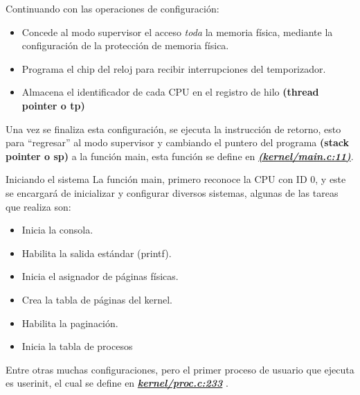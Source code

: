 \documentclass{libs/ufc_format}
\begin{document}
\begin{frame}{}
  Continuando con las operaciones de configuración:
  \begin{itemize}
    \item Concede al modo supervisor el acceso \emph{toda} la memoria física, mediante la configuración de la protección de memoria física.
    \item Programa el chip del reloj para recibir interrupciones del temporizador.
    \item Almacena el identificador de cada CPU en el registro de hilo \textbf{(thread pointer o tp)}
  \end{itemize}

  \vspace{0.3cm}

  Una vez se finaliza esta configuración, se ejecuta la instrucción de retorno, esto para “regresar” al modo supervisor y cambiando el puntero del programa \textbf{(stack pointer o sp)} a la función main, esta función se define en \href{https://github.com/CarlosSandoval-03/xv6-riscv/blob/riscv/kernel/main.c\#L11}{\textbf{\textit{(kernel/main.c:11)}}}. \cite{xv6_book} \cite{xv6}
\end{frame}
\begin{frame}{Iniciando el sistema}
  La función main, primero reconoce la CPU con ID 0, y este se encargará de inicializar y configurar diversos sistemas, algunas de las tareas que realiza son:

  \vspace{0.2cm}

  \begin{itemize}
    \item Inicia la consola.
    \item Habilita la salida estándar (printf).
    \item Inicia el asignador de páginas físicas.
    \item Crea la tabla de páginas del kernel.
    \item Habilita la paginación.
    \item Inicia la tabla de procesos
  \end{itemize}

  \vspace{0.2cm}

  Entre otras muchas configuraciones, pero el primer proceso de usuario que ejecuta es userinit, el cual se define en \href{https://github.com/CarlosSandoval-03/xv6-riscv/blob/riscv/kernel/proc.c\#L233}{\textbf{\textit{kernel/proc.c:233}}} \cite{xv6}.
\end{frame}
\end{document}
